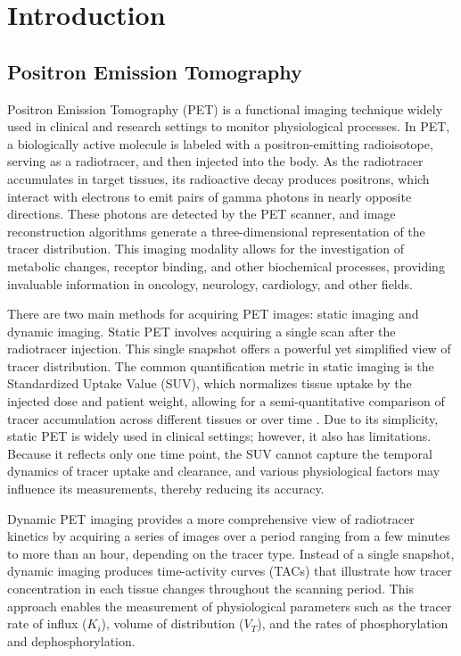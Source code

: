 \chapter{Introduction}
\section{Positron Emission Tomography}
Positron Emission Tomography (PET) is a functional imaging technique widely used in clinical and research settings to monitor physiological processes.
In PET, a biologically active molecule is labeled with a positron-emitting radioisotope, serving as a radiotracer, and then injected into the body.
As the radiotracer accumulates in target tissues, its radioactive decay produces positrons, which interact with electrons to emit pairs of gamma photons in nearly opposite directions.
These photons are detected by the PET scanner, and image reconstruction algorithms generate a three-dimensional representation of the tracer distribution.
This imaging modality allows for the investigation of metabolic changes, receptor binding, and other biochemical processes, providing invaluable information in oncology, neurology, cardiology, and other fields.

There are two main methods for acquiring PET images: static imaging and dynamic imaging.
Static PET involves acquiring a single scan after the radiotracer injection.
This single snapshot offers a powerful yet simplified view of tracer distribution.
The common quantification metric in static imaging is the Standardized Uptake Value (SUV), which normalizes tissue uptake by the injected dose and patient weight, allowing for a semi-quantitative comparison of tracer accumulation across different tissues or over time \cite{TODO}.
Due to its simplicity, static PET is widely used in clinical settings; however, it also has limitations.
Because it reflects only one time point, the SUV cannot capture the temporal dynamics of tracer uptake and clearance, and various physiological factors may influence its measurements, thereby reducing its accuracy.

Dynamic PET imaging provides a more comprehensive view of radiotracer kinetics by acquiring a series of images over a period ranging from a few minutes to more than an hour, depending on the tracer type.
Instead of a single snapshot, dynamic imaging produces time-activity curves (TACs) that illustrate how tracer concentration in each tissue changes throughout the scanning period.
This approach enables the measurement of physiological parameters such as the tracer rate of influx (\(K_i\)), volume of distribution (\(V_T\)), and the rates of phosphorylation and dephosphorylation.

